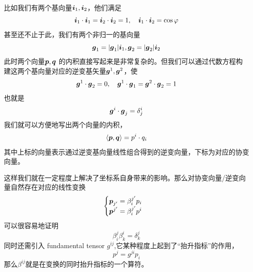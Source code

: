 \documentclass[12pt,a4paper,openany,twoside]{book}
\numberwithin{equation}{section}
\newcommand{\mean}[1]{\left\langle #1 \right\rangle}
\begin{document}
        比如我们有两个基向量$\vb*{i}_1,\vb*{i}_2$，他们满足
        \begin{equation*}
          \vb*{i}_1 \cdot \vb*{i}_1 = \vb*{i}_2 \cdot \vb*{i}_2 = 1, \quad \vb*{i}_1 \cdot \vb*{i}_2 = \cos{\varphi}
        \end{equation*} 
        甚至还不止于此，我们有两个非归一的基向量
        \begin{equation*}
          \vb*{g}_1 = \abs{\vb*{g}_1} \vb*{i}_1, \vb*{g}_2 = \abs{\vb*{g}_2} \vb*{i}_2
        \end{equation*} 
        此时两个向量$\vb*{p},\vb*{q}$ 的内积直接写起来是非常复杂的。但我们可以通过代数方程构建这两个基向量对应的逆变基矢量$\vb*{g}^1,\vb*{g}^2$，使
        \begin{equation*}
          \vb*{g}^1 \cdot \vb*{g}_2  = 0, \quad \vb*{g}^1 \cdot \vb*{g}_1 = \vb*{g}^2 \cdot \vb*{g}_2 = 1 
        \end{equation*} 
        也就是
        \begin{equation*}
          \vb*{g}^i \cdot \vb*{g}_j = \delta^i_j
        \end{equation*}
        我们就可以方便地写出两个向量的内积，
        \begin{equation*}
          \mean{\vb*{p},\vb*{q}} = p^i \cdot q_i
        \end{equation*} 
        其中上标的向量表示通过逆变基向量线性组合得到的逆变向量，下标为对应的协变向量。

        这样我们就在一定程度上解决了坐标系自身带来的影响。那么对协变向量/逆变向量自然存在对应的线性变换
        \begin{equation*}
          \begin{cases}
            \vb*{p}_{j'} = \beta^{j'}_i p_i \\
            \vb*{p}^{j'} = \beta^{j'}_i p^i
          \end{cases}
        \end{equation*} 
        可以很容易地证明
        \begin{equation*}
          \beta^j_i \beta^i_k = \delta^j_k
        \end{equation*}
        同时还需引入 fundamental tensor $g^{ij}$,它某种程度上起到了“抬升指标”的作用，
        \begin{equation*}
          p^j = g^{ji} p_i
        \end{equation*} 
        那么$\beta^{ij}$就是在变换的同时抬升指标的一个算符。
\end{document}
